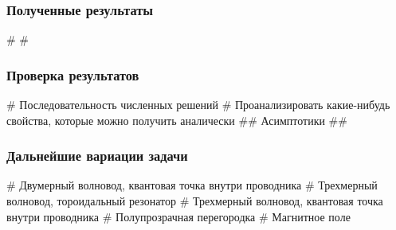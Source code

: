 \documentclass{beamer}
\begin{document}
\begin{frame}[fragile]
\frametitle{Полученные результаты}
\begin{easylist}[itemize]
# 
# 
\end{easylist}
\end{frame}

\begin{frame}[fragile]
\frametitle{Проверка результатов}
\begin{easylist}[itemize]
# Последовательность численных решений
# Проанализировать какие-нибудь свойства, которые можно получить аналически
## Асимптотики
## 
\end{easylist}
\end{frame}

\begin{frame}[fragile]
\frametitle{Дальнейшие вариации задачи}
\begin{easylist}[itemize]
# Двумерный волновод, квантовая точка внутри проводника
# Трехмерный волновод, тороидальный резонатор 
# Трехмерный волновод, квантовая точка внутри проводника
# Полупрозрачная перегородка 
# Магнитное поле 
\end{easylist}
\end{frame}
\end{document}
